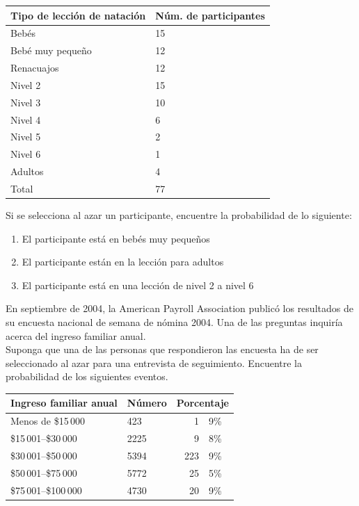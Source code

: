 \documentclass[11pt,twoside]{article}
\begin{document}
\begin{enumerate}
\begin{center}
\begin{tabular}{ll}
Tipo de lección de natación & Núm. de participantes\\ \hline
Bebés & 15\\
Bebé muy pequeño & 12\\
Renacuajos & 12\\
Nivel 2 & 15\\
Nivel 3 & 10\\
Nivel 4 & 6\\
Nivel 5 & 2\\
Nivel 6 & 1\\
Adultos & 4\\ \hline
Total & 77
\end{tabular}
\end{center}
Si se selecciona al azar un participante, encuentre la probabilidad de lo siguiente:
\begin{enumerate}
 \item El participante está en bebés muy pequeños
 \item El participante están en la lección para adultos
 \item El participante está en una lección de nivel 2 a nivel 6
\end{enumerate}
\begin{minipage}{.4\textwidth}
\item En septiembre de 2004, la American Payroll Association publicó los  
resultados de su encuesta nacional de semana de nómina 2004. Una de las preguntas inquiría acerca del ingreso familiar anual.\\
Suponga que una de las personas que respondieron las encuesta ha de ser seleccionado al azar para una entrevista de seguimiento. Encuentre la probabilidad de los siguientes eventos.
\end{minipage}\hfill
\begin{minipage}{.6\textwidth}
\begin{center}
\begin{tabular}{llr@{.}l}
Ingreso familiar anual & Número &\multicolumn{2}{l}{Porcentaje} \\ \hline
Menos de \$15\,000 & 423 & 1&9\% \\
\$15\,001--\$30\,000 & 2225 & 9&8\%\\
\$30\,001--\$50\,000 & 5394 & 223&9\%\\
\$50\,001--\$75\,000 & 5772 & 25&5\%\\
\$75\,001--\$100\,000 & 4730 & 20&9\%\\

\end{tabular}
\end{center}
\end{minipage}
\end{enumerate}
\end{document}
